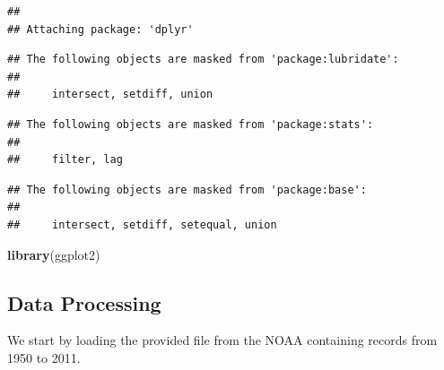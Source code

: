 \documentclass[]{article}
\newenvironment{Shaded}{\begin{snugshade}}{\end{snugshade}}
\newcommand{\KeywordTok}[1]{\textcolor[rgb]{0.13,0.29,0.53}{\textbf{{#1}}}}
\newcommand{\StringTok}[1]{\textcolor[rgb]{0.31,0.60,0.02}{{#1}}}
\newcommand{\NormalTok}[1]{{#1}}
\begin{document}
\begin{verbatim}
## 
## Attaching package: 'dplyr'
\end{verbatim}

\begin{verbatim}
## The following objects are masked from 'package:lubridate':
## 
##     intersect, setdiff, union
\end{verbatim}

\begin{verbatim}
## The following objects are masked from 'package:stats':
## 
##     filter, lag
\end{verbatim}

\begin{verbatim}
## The following objects are masked from 'package:base':
## 
##     intersect, setdiff, setequal, union
\end{verbatim}

\begin{Shaded}
\begin{Highlighting}[]
\KeywordTok{library}\NormalTok{(ggplot2)}
\end{Highlighting}
\end{Shaded}

\subsection{Data Processing}\label{data-processing}

We start by loading the provided file from the NOAA containing records
from 1950 to 2011.

\begin{Shaded}
\end{Shaded}
\end{document}
